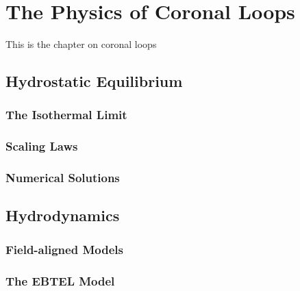 \chapter{The Physics of Coronal Loops}\label{ch:loops}



This is the chapter on coronal loops

\section{Hydrostatic Equilibrium}



\subsection{The Isothermal Limit}

\subsection{Scaling Laws}\label{sec:scaling_laws}


\subsection{Numerical Solutions}


\section{Hydrodynamics}


\subsection{Field-aligned Models}


\subsection{The EBTEL Model}\label{sec:ebtel}


